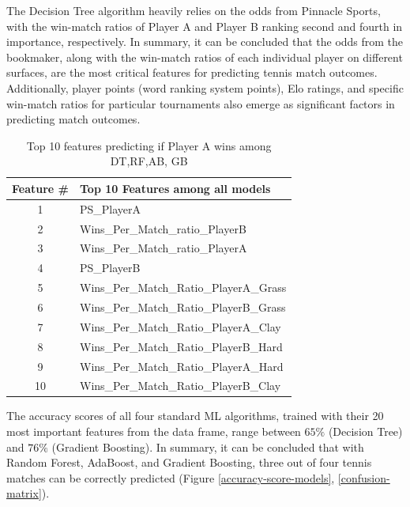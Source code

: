 \documentclass[preprint,aps,nofootinbib,a4paper,superscriptaddress,longbibliography,amsfonts,amssymb,amsmath,titlepage]{revtex4-2}
\begin{document}
%
The Decision Tree algorithm heavily relies on the odds from Pinnacle Sports, with the win-match ratios of Player A and Player B ranking second and fourth in importance, respectively.
In summary, it can be concluded that the odds from the bookmaker, along with the win-match ratios of each individual player on different surfaces, are the most critical features for predicting tennis match outcomes. Additionally, player points (word ranking system points), Elo ratings, and specific win-match ratios for particular tournaments also emerge as significant factors in predicting match outcomes.

\begin{table}[h]
\centering
\begin{tabular}{|c|l|}
\hline
\textbf{Feature \#} & \textbf{Top 10 Features among all models} \\
\hline
1 & PS\_PlayerA \\
2 & Wins\_Per\_Match\_ratio\_PlayerB \\
3 & Wins\_Per\_Match\_ratio\_PlayerA \\
4 & PS\_PlayerB \\
5 & Wins\_Per\_Match\_Ratio\_PlayerA\_Grass \\
6 & Wins\_Per\_Match\_Ratio\_PlayerB\_Grass \\
7 & Wins\_Per\_Match\_Ratio\_PlayerA\_Clay \\
8 & Wins\_Per\_Match\_Ratio\_PlayerB\_Hard \\
9 & Wins\_Per\_Match\_Ratio\_PlayerA\_Hard \\
10 & Wins\_Per\_Match\_Ratio\_PlayerB\_Clay \\
\hline
\end{tabular}
\label{top-10-features-table}
\caption{Top 10 features predicting if Player A wins among DT,RF,AB, GB}
\end{table}

The accuracy scores of all four standard ML algorithms, trained with their 20 most important features from the data frame, range between $65 \%$ (Decision Tree) and $76 \%$ (Gradient Boosting). In summary, it can be concluded that with Random Forest, AdaBoost, and Gradient Boosting, three out of four tennis matches can be correctly predicted (Figure \ref{accuracy-score-models}, \ref{confusion-matrix}).
\end{document}
